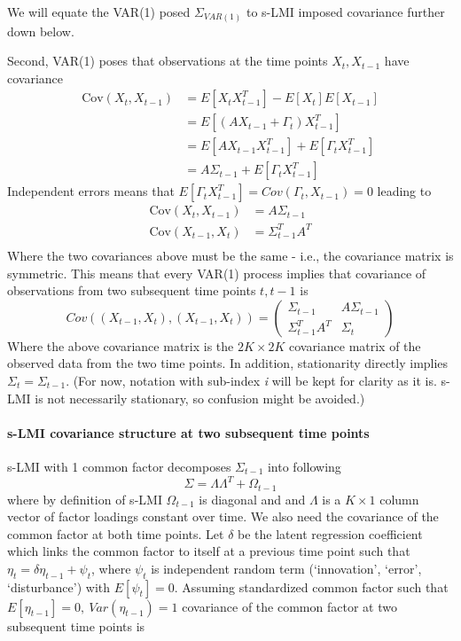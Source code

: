 \documentclass[
  letterpaper,
  DIV=11,
  numbers=noendperiod]{scrartcl}
\let\oldparagraph\paragraph
\renewcommand{\paragraph}[1]{\oldparagraph{#1}\mbox{}}
\begin{document}
We will equate the VAR(1) posed \(\Sigma_{VAR(1)}\) to s-LMI imposed
covariance further down below.

Second, VAR(1) poses that observations at the time points
\(X_t, X_{t-1}\) have covariance \[
\begin{align*}
\text{Cov}(X_t,X_{t-1})&=
E[X_tX_{t-1}^T]-E[X_t]E[X_{t-1}]\\&=
E[(AX_{t-1}+\Gamma_t)X_{t-1}^T]\\&=
E[AX_{t-1}X_{t-1}^T]+E[\Gamma_tX_{t-1}^T]\\&=
A\Sigma_{t-1}+E[\Gamma_tX_{t-1}^T]
\end{align*}
\] Independent errors means that
\(E[\Gamma_tX_{t-1}^T]=Cov(\Gamma_t,X_{t-1})=0\) leading to \[
\begin{align*}
\text{Cov}(X_t,X_{t-1})&= A\Sigma_{t-1}\\
\text{Cov}(X_{t-1},X_t)&= \Sigma_{t-1}^T A^T \\
\end{align*}
\] Where the two covariances above must be the same - i.e., the
covariance matrix is symmetric. This means that every VAR(1) process
implies that covariance of observations from two subsequent time points
\(t, t-1\) is \[
Cov((X_{t-1},X_{t}),(X_{t-1},X_{t})) = 
\begin{pmatrix} 
  \Sigma_{t-1} & A\Sigma_{t-1} \\
  \Sigma_{t-1}^TA^T & \Sigma_t
\end{pmatrix} \] Where the above covariance matrix is the
\(2K\times 2K\) covariance matrix of the observed data from the two time
points. In addition, stationarity directly implies
\(\Sigma_t=\Sigma_{t-1}\). (For now, notation with sub-index \emph{i}
will be kept for clarity as it is. s-LMI is not necessarily stationary,
so confusion might be avoided.)

\hypertarget{s-lmi-covariance-structure-at-two-subsequent-time-points}{%
\paragraph{s-LMI covariance structure at two subsequent time
points}\label{s-lmi-covariance-structure-at-two-subsequent-time-points}}

s-LMI with 1 common factor decomposes \(\Sigma_{t-1}\) into following
\[\Sigma=\Lambda\Lambda^T+\Omega_{t-1}\]where by definition of s-LMI
\(\Omega_{t-1}\) is diagonal and and \(\Lambda\) is a \(K\times1\)
column vector of factor loadings constant over time. We also need the
covariance of the common factor at both time points. Let \(\delta\) be
the latent regression coefficient which links the common factor to
itself at a previous time point such that
\(\eta_t=\delta\eta_{t-1}+\psi_t\), where \(\psi_t\) is independent
random term (`innovation', `error', `disturbance') with \(E[\psi_t]=0\).
Assuming standardized common factor such that
\(E[\eta_{t-1}]=0,\:Var(\eta_{t-1})=1\) covariance of the common factor
at two subsequent time points is
\end{document}
